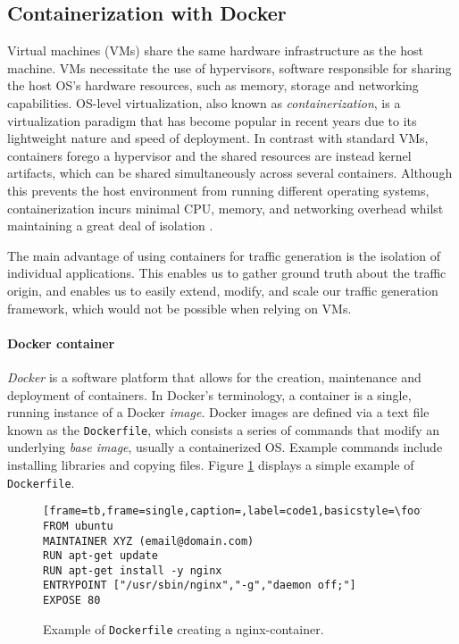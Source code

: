 \subsection{Containerization with Docker}
Virtual machines (VMs) share the same hardware infrastructure as the host machine. VMs necessitate the use of hypervisors, software responsible for sharing the host OS's hardware resources, such as memory, storage and networking capabilities. OS-level virtualization, also known as \textit{containerization}, is a virtualization paradigm that has become popular in recent years due to its lightweight nature and speed of deployment. 
In contrast with standard VMs, containers forego a hypervisor and the shared resources are instead kernel artifacts, which can be shared simultaneously across several containers. Although this prevents the host environment from running different operating systems, containerization incurs minimal CPU, memory, and networking overhead whilst maintaining a great deal of isolation \cite{kolyshkin2006virtualization}. 
 

The main advantage of using containers for traffic generation is the isolation of individual applications. This enables us to gather ground truth about the traffic origin, and enables us to easily extend, modify, and scale our traffic generation framework, which would not be possible when relying on VMs.

 



\paragraph*{Docker container}


\textit{Docker} is a software platform that allows for the creation, maintenance and deployment of containers. In Docker's terminology, a container is a single, running instance of a Docker \textit{image}. Docker images are defined via a text file known as the \texttt{Dockerfile}, which consists a series of commands that modify an underlying \textit{base image}, usually a containerized OS. Example commands include installing libraries and copying files. Figure \ref{figD:dockerfile} displays a simple example of \texttt{Dockerfile}.


\begin{figure}
\begin{lstlisting}[frame=tb,frame=single,caption=,label=code1,basicstyle=\footnotesize]
FROM ubuntu
MAINTAINER XYZ (email@domain.com)
RUN apt-get update
RUN apt-get install -y nginx
ENTRYPOINT ["/usr/sbin/nginx","-g","daemon off;"]
EXPOSE 80
\end{lstlisting}
 \caption{Example of \texttt{Dockerfile} creating a nginx-container.}
 \label{figD:dockerfile}
\end{figure}

